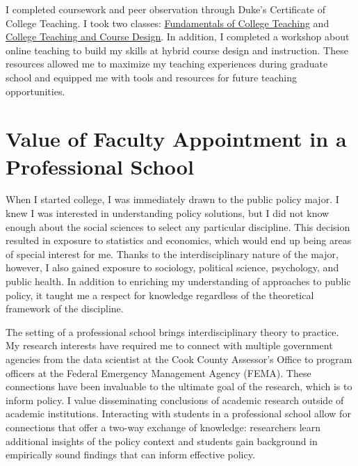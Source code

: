 I completed coursework and peer observation through Duke's Certificate of College Teaching. I took two classes: \href{https://gradschool.duke.edu/professional-development/programs/certificate-college-teaching/coursework-teaching/gs750/}{Fundamentals of College Teaching} and \href{https://gradschool.duke.edu/professional-development/programs/certificate-college-teaching/coursework-teaching/gs755-college/}{College Teaching and Course Design}. In addition, I completed a workshop about online teaching to build my skills at hybrid course design and instruction. These resources allowed me to maximize my teaching experiences during graduate school and equipped me with tools and resources for future teaching opportunities.


\section{Value of Faculty Appointment in a Professional School}

When I started college, I was immediately drawn to the public policy major. I knew I was interested in understanding policy solutions, but I did not know enough about the social sciences to select any particular discipline. This decision resulted in exposure to statistics and economics, which would end up being areas of special interest for me. Thanks to the interdisciplinary nature of the major, however, I also gained exposure to sociology, political science, psychology, and public health. In addition to enriching my understanding of approaches to public policy, it taught me a respect for knowledge regardless of the theoretical framework of the discipline. 

The setting of a professional school brings interdisciplinary theory to practice. My research interests have required me to connect with multiple government agencies from the data scientist at the Cook County Assessor's Office to program officers at the Federal Emergency Management Agency (FEMA). These connections have been invaluable to the ultimate goal of the research, which is to inform policy. I value disseminating conclusions of academic research outside of academic institutions. Interacting with students in a professional school allow for connections that offer a two-way exchange of knowledge: researchers learn additional insights of the policy context and students gain background in empirically sound findings that can inform effective policy.


\singlespacing





